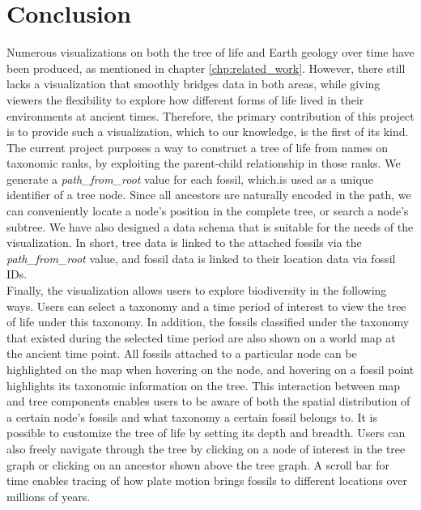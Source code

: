 \documentclass[11pt, a4paper,oneside,chapterprefix=false]{scrbook}
\begin{document}
\chapter{Conclusion} \label{chp:conclusion}
Numerous visualizations on both the tree of life and Earth geology over time have been produced, as mentioned in chapter \ref{chp:related_work}. However, there still lacks a visualization that smoothly bridges data in both areas, while giving viewers the flexibility to explore how different forms of life lived in their environments at ancient times. Therefore, the primary contribution of this project is to provide such a visualization, which to our knowledge, is the first of its kind. \\

The current project purposes a way to construct a tree of life from names on taxonomic ranks, by exploiting the parent-child relationship in those ranks. We generate a \emph{path\_from\_root} value for each fossil, which.is used as a unique identifier of a tree node. Since all ancestors are naturally encoded in the path, we can conveniently locate a node's position in the complete tree, or search a node's subtree. We have also designed a data schema that is suitable for the needs of the visualization. In short, tree data is linked to the attached fossils via the \emph{path\_from\_root} value, and fossil data is linked to their location data via fossil IDs. \\

Finally, the visualization allows users to explore biodiversity in the following ways. Users can select a taxonomy and a time period of interest to view the tree of life under this taxonomy. In addition, the fossils classified under the taxonomy that existed during the selected time period are also shown on a world map at the ancient time point. All fossils attached to a particular node can be highlighted on the map when hovering on the node, and hovering on a fossil point highlights its taxonomic information on the tree. This interaction between map and tree components enables users to be aware of both the spatial distribution of a certain node's fossils and what taxonomy a certain fossil belongs to. It is possible to customize the tree of life by setting its depth and breadth. Users can also freely navigate through the tree by clicking on a node of interest in the tree graph or clicking on an ancestor shown above the tree graph. A scroll bar for time enables tracing of how plate motion brings fossils to different locations over millions of years. \\
\end{document}
